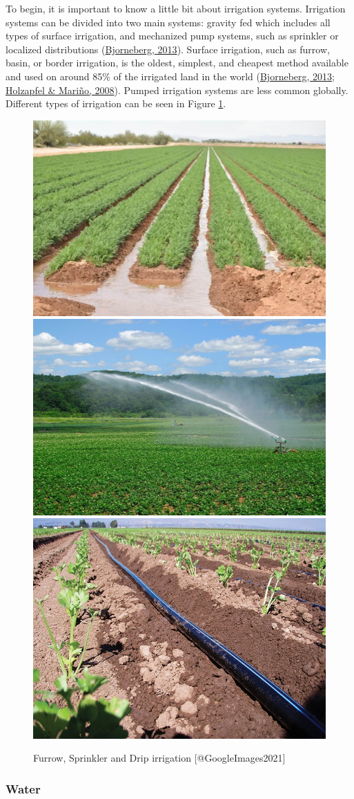 \documentclass[12pt,twoside]{reedthesis}
\begin{document}
To begin, it is important to know a little bit about irrigation systems. Irrigation systems can be divided into two main systems: gravity fed which includes all types of surface irrigation, and mechanized pump systems, such as sprinkler or localized distributions (\protect\hyperlink{ref-bjornebergIRRIGATIONMethods2013}{Bjorneberg, 2013}). Surface irrigation, such as furrow, basin, or border irrigation, is the oldest, simplest, and cheapest method available and used on around 85\% of the irrigated land in the world (\protect\hyperlink{ref-bjornebergIRRIGATIONMethods2013}{Bjorneberg, 2013}; \protect\hyperlink{ref-holzapfelIrrigationAgriculture2008}{Holzapfel \& Mariño, 2008}). Pumped irrigation systems are less common globally. Different types of irrigation can be seen in Figure \ref{fig:irrigationtypes}.
\begin{figure}

{\centering \includegraphics[width=0.3\linewidth,height=0.2\textheight]{figure/FurrowPic} \includegraphics[width=0.3\linewidth,height=0.2\textheight]{figure/Irrigation-sprinklers} \includegraphics[width=0.3\linewidth,height=0.2\textheight]{figure/DripIrrigation} 

}

\caption{Furrow, Sprinkler and Drip irrigation  [@GoogleImages2021]}\label{fig:irrigationtypes}
\end{figure}
\hypertarget{water}{%
\subsubsection{Water}\label{water}}
\end{document}
